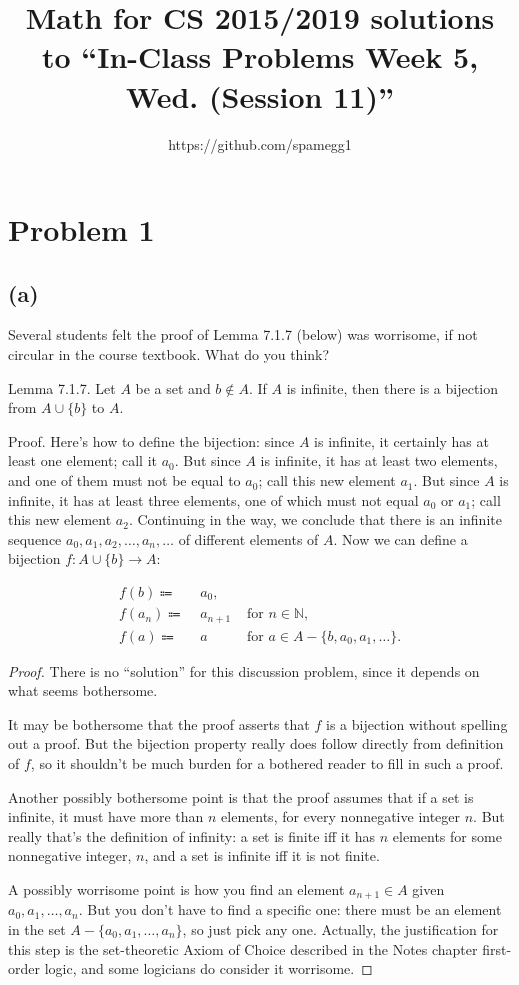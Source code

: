 \documentclass[14pt]{extarticle}
\title{Math for CS 2015/2019 solutions to ``In-Class Problems Week 5, Wed. (Session 11)''}
\author{https://github.com/spamegg1}
\begin{document}
\maketitle
\tableofcontents

\section{Problem 1}
\subsection{(a)} Several students felt the proof of Lemma 7.1.7 (below) was worrisome, if not circular in the course textbook. What do you think?

Lemma 7.1.7. Let $A$ be a set and $b \notin A$. If $A$ is infinite, then there is a bijection from $A \cup \{b\}$ to $A$.

Proof. Here’s how to define the bijection: since $A$ is infinite, it certainly has at least one element; call it $a_0$. But since $A$ is infinite, it has at least two elements, and one of them must not be equal to $a_0$; call this new element $a_1$. But since $A$ is infinite, it has at least three elements, one of which must not equal $a_0$ or $a_1$; call this new element $a_2$. Continuing in the way, we conclude that there is an infinite sequence $a_0, a_1, a_2, \ldots, a_n, \ldots$ of different elements of $A$. Now we can define a bijection $f: A \cup \{b\} \to A$:

\begin{align*}
f(b)  \Coloneqq &\,\, a_0, & \\
f(a_n)  \Coloneqq &\,\, a_{n+1} & \text{ for } n \in \mathbb{N},\\
f(a)  \Coloneqq &\,\, a & \text{ for } a \in A - \{b, a_0, a_1, \ldots \}.
\end{align*}

\begin{proof}
There is no ``solution'' for this discussion problem, since it depends on what seems bothersome.

It may be bothersome that the proof asserts that $f$ is a bijection without spelling out a proof. But the bijection property really does follow directly from definition of $f$, so it shouldn’t be much burden for a bothered reader to fill in such a proof.

Another possibly bothersome point is that the proof assumes that if a set is infinite, it must have more than $n$ elements, for every nonnegative integer $n$. But really that’s the definition of infinity: a set is finite iff it has $n$ elements for some nonnegative integer, $n$, and a set is infinite iff it is not finite.

A possibly worrisome point is how you find an element $a_{n+1 }\in A$ given $a_0, a_1, \ldots, a_n$. But you don’t have to find a specific one: there must be an element in the set $A - \{a_0, a_1, \ldots, a_n\}$, so just pick any one. Actually, the justification for this step is the set-theoretic Axiom of Choice described in the Notes chapter first-order logic, and some logicians do consider it worrisome.
\end{proof}
\end{document}
